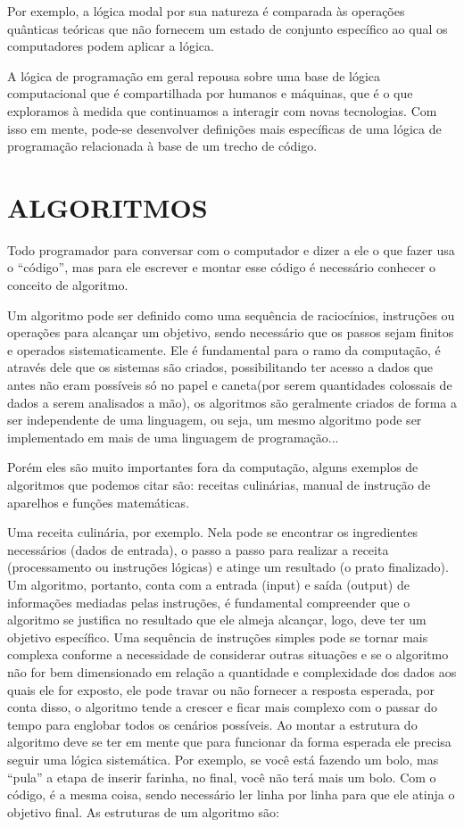 Por exemplo, a lógica modal por sua natureza é comparada às operações quânticas teóricas que não fornecem um estado de conjunto específico ao qual os computadores podem aplicar a lógica. 

A lógica de programação em geral repousa sobre uma base de lógica computacional que é compartilhada por humanos e máquinas, que é o que exploramos à medida que continuamos a interagir com novas tecnologias. Com isso em mente, pode-se desenvolver definições mais específicas de uma lógica de programação relacionada à base de um trecho de código. 

\section{ALGORITMOS}
\label{sec:ALGORITMOS}

Todo programador para conversar com o computador e dizer a ele o que fazer usa o “código”, mas para ele escrever e montar esse código é necessário conhecer o conceito de algoritmo.  

Um algoritmo pode ser definido como uma sequência de raciocínios, instruções ou operações para alcançar um objetivo, sendo necessário que os passos sejam finitos e operados sistematicamente. 
Ele é fundamental para o ramo da computação, é através dele que os sistemas são criados, possibilitando ter acesso a dados que antes não eram possíveis só no papel e caneta(por serem quantidades colossais de dados a serem analisados a mão), os algoritmos são geralmente criados de forma a ser independente de uma linguagem, ou seja, um mesmo algoritmo pode ser implementado em mais de uma linguagem de programação... \cite{medina2006algoritmos}

Porém eles são muito importantes fora da computação, alguns exemplos de algoritmos que podemos citar são: receitas culinárias, manual de instrução de aparelhos e funções matemáticas. \cite{medina2006algoritmos}

Uma receita culinária, por exemplo. Nela pode se encontrar os ingredientes necessários (dados de entrada), o passo a passo para realizar a receita (processamento ou instruções lógicas) e atinge um resultado (o prato finalizado). 
Um algoritmo, portanto, conta com a entrada (input) e saída (output) de informações mediadas pelas instruções, é fundamental compreender que o algoritmo se justifica no resultado que ele almeja alcançar, logo, deve ter um objetivo específico. Uma sequência de instruções simples pode se tornar mais complexa conforme a necessidade de considerar outras situações e se o algoritmo não for bem dimensionado em relação a quantidade e complexidade dos dados aos quais ele for exposto, ele pode travar ou não fornecer a resposta esperada, por conta disso, o algoritmo tende a crescer e ficar mais complexo com o passar do tempo para englobar todos os cenários possíveis. 
Ao montar a estrutura do algoritmo deve se ter em mente que para funcionar da forma esperada ele precisa seguir uma lógica sistemática. Por exemplo, se você está fazendo um bolo, mas “pula” a etapa de inserir farinha, no final, você não terá mais um bolo. 
Com o código, é a mesma coisa, sendo necessário ler linha por linha para que ele atinja o objetivo final. As estruturas de um algoritmo são: 

